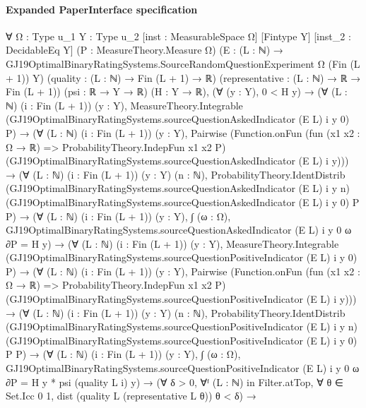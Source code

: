 \documentclass[10pt]{article}
\begin{document}
\paragraph{Expanded PaperInterface specification}
\begin{ReviewVerbatim}
∀ {Ω : Type u_1} {Y : Type u_2} [inst : MeasurableSpace Ω] [Fintype Y] [inst_2 : DecidableEq Y]
  (P : MeasureTheory.Measure Ω)
  (E : (L : ℕ) → GJ19OptimalBinaryRatingSystems.SourceRandomQuestionExperiment Ω (Fin (L + 1)) Y)
  (quality : (L : ℕ) → Fin (L + 1) → ℝ) (representative : (L : ℕ) → ℝ → Fin (L + 1)) (psi : ℝ → Y → ℝ) (H : Y → ℝ),
  (∀ (y : Y), 0 < H y) →
    (∀ (L : ℕ) (i : Fin (L + 1)) (y : Y),
        MeasureTheory.Integrable (GJ19OptimalBinaryRatingSystems.sourceQuestionAskedIndicator (E L) i y 0) P) →
      (∀ (L : ℕ) (i : Fin (L + 1)) (y : Y),
          Pairwise
            (Function.onFun (fun (x1 x2 : Ω → ℝ) => ProbabilityTheory.IndepFun x1 x2 P)
              (GJ19OptimalBinaryRatingSystems.sourceQuestionAskedIndicator (E L) i y))) →
        (∀ (L : ℕ) (i : Fin (L + 1)) (y : Y) (n : ℕ),
            ProbabilityTheory.IdentDistrib (GJ19OptimalBinaryRatingSystems.sourceQuestionAskedIndicator (E L) i y n)
              (GJ19OptimalBinaryRatingSystems.sourceQuestionAskedIndicator (E L) i y 0) P P) →
          (∀ (L : ℕ) (i : Fin (L + 1)) (y : Y),
              ∫ (ω : Ω), GJ19OptimalBinaryRatingSystems.sourceQuestionAskedIndicator (E L) i y 0 ω ∂P = H y) →
            (∀ (L : ℕ) (i : Fin (L + 1)) (y : Y),
                MeasureTheory.Integrable (GJ19OptimalBinaryRatingSystems.sourceQuestionPositiveIndicator (E L) i y 0)
                  P) →
              (∀ (L : ℕ) (i : Fin (L + 1)) (y : Y),
                  Pairwise
                    (Function.onFun (fun (x1 x2 : Ω → ℝ) => ProbabilityTheory.IndepFun x1 x2 P)
                      (GJ19OptimalBinaryRatingSystems.sourceQuestionPositiveIndicator (E L) i y))) →
                (∀ (L : ℕ) (i : Fin (L + 1)) (y : Y) (n : ℕ),
                    ProbabilityTheory.IdentDistrib
                      (GJ19OptimalBinaryRatingSystems.sourceQuestionPositiveIndicator (E L) i y n)
                      (GJ19OptimalBinaryRatingSystems.sourceQuestionPositiveIndicator (E L) i y 0) P P) →
                  (∀ (L : ℕ) (i : Fin (L + 1)) (y : Y),
                      ∫ (ω : Ω), GJ19OptimalBinaryRatingSystems.sourceQuestionPositiveIndicator (E L) i y 0 ω ∂P =
                        H y * psi (quality L i) y) →
                    (∀ δ > 0,
                        ∀ᶠ (L : ℕ) in Filter.atTop, ∀ θ ∈ Set.Icc 0 1, dist (quality L (representative L θ)) θ < δ) →

\end{ReviewVerbatim}
\end{document}
